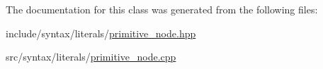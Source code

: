 The documentation for this class was generated from the following files\+:\begin{DoxyCompactItemize}
\item 
include/syntax/literals/\hyperlink{primitive__node_8hpp}{primitive\+\_\+node.\+hpp}\item 
src/syntax/literals/\hyperlink{primitive__node_8cpp}{primitive\+\_\+node.\+cpp}\end{DoxyCompactItemize}
